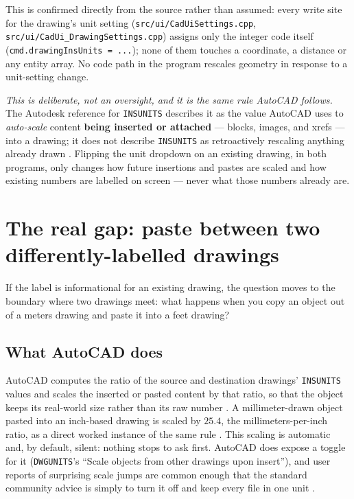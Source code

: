 \documentclass[11pt]{article}
\begin{document}
This is confirmed directly from the source rather than assumed: every
write site for the drawing's unit setting
(\texttt{src/ui/CadUiSettings.cpp}, \texttt{src/ui/CadUi\_DrawingSettings.cpp})
assigns only the integer code itself (\texttt{cmd.drawingInsUnits = ...}); none
of them touches a coordinate, a distance or any entity array. No code path
in the program rescales geometry in response to a unit-setting change.

\emph{This is deliberate, not an oversight, and it is the same rule
AutoCAD follows.} The Autodesk reference for \texttt{INSUNITS} describes it
as the value AutoCAD uses to \emph{auto-scale} content \textbf{being
inserted or attached} --- blocks, images, and xrefs --- into a drawing; it
does not describe \texttt{INSUNITS} as retroactively rescaling anything
already drawn \citep{autodeskInsunits}. Flipping the unit dropdown on an
existing drawing, in both programs, only changes how future insertions and
pastes are scaled and how existing numbers are labelled on screen --- never
what those numbers already are.

\section{The real gap: paste between two differently-labelled drawings}
\label{sec:gap}

If the label is informational for an existing drawing, the question moves
to the boundary where two drawings meet: what happens when you copy an
object out of a meters drawing and paste it into a feet drawing?

\subsection*{What AutoCAD does}

AutoCAD computes the ratio of the source and destination drawings'
\texttt{INSUNITS} values and scales the inserted or pasted content by that
ratio, so that the object keeps its real-world size rather than its raw
number \citep{autodeskInsunits}. A millimeter-drawn object pasted into an
inch-based drawing is scaled by $25.4$, the millimeters-per-inch ratio, as a
direct worked instance of the same rule \citep{autodeskInsunits}. This
scaling is automatic and, by default, silent: nothing stops to ask first.
AutoCAD does expose a toggle for it (\texttt{DWGUNITS}'s ``Scale objects
from other drawings upon insert''), and user reports of surprising scale
jumps are common enough that the standard community advice is simply to
turn it off and keep every file in one unit \citep{autodeskInsunits}.
\end{document}
